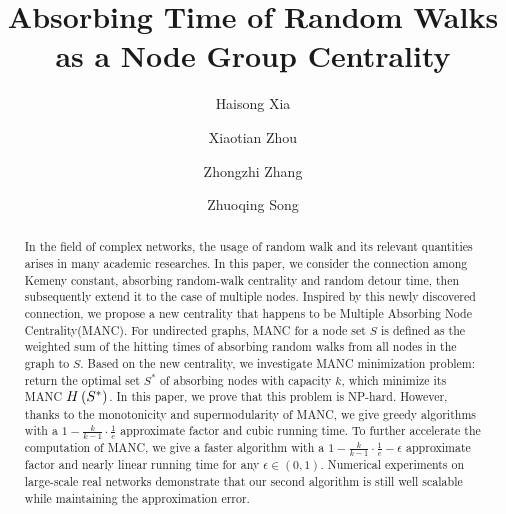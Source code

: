 \documentclass[sigconf]{acmart}
\begin{document}
\sloppy
\fancyhead{}
\title{Absorbing Time of Random Walks as a Node Group Centrality}
\author{Haisong Xia}
\author{Xiaotian Zhou}
\author{Zhongzhi Zhang\footnotemark}
\author{Zhuoqing Song}
\begin{abstract}
  In the field of complex networks, the usage of random walk and its relevant quantities arises in many academic researches.
  In this paper, we consider the connection among Kemeny constant, absorbing random-walk centrality and random detour time, then subsequently extend it to the case of multiple nodes.
  Inspired by this newly discovered connection, we propose a new centrality that happens to be Multiple Absorbing Node Centrality(MANC).
  For undirected graphs, MANC for a node set \(S\) is defined as the weighted sum of the hitting times of absorbing random walks from all nodes in the graph to \(S\).
  Based on the new centrality, we investigate MANC minimization problem: return the optimal set \(S^*\) of absorbing nodes with capacity \(k\), which minimize its MANC \(H\left(S^*\right)\).
  In this paper, we prove that this problem is NP-hard.
  However, thanks to the monotonicity and supermodularity of MANC, we give greedy algorithms with a \(1-\frac{k}{k-1}\cdot\frac{1}{e}\) approximate factor and cubic running time.
  To further accelerate the computation of MANC, we give a faster algorithm with a \(1-\frac{k}{k-1}\cdot\frac{1}{e}-\epsilon\) approximate factor and nearly linear running time for any \(\epsilon\in(0,1)\).
  Numerical experiments on large-scale real networks demonstrate that our second algorithm is still well scalable while maintaining the approximation error.
\end{abstract}
\maketitle
\renewcommand{\thefootnote}{*}
\end{document}
